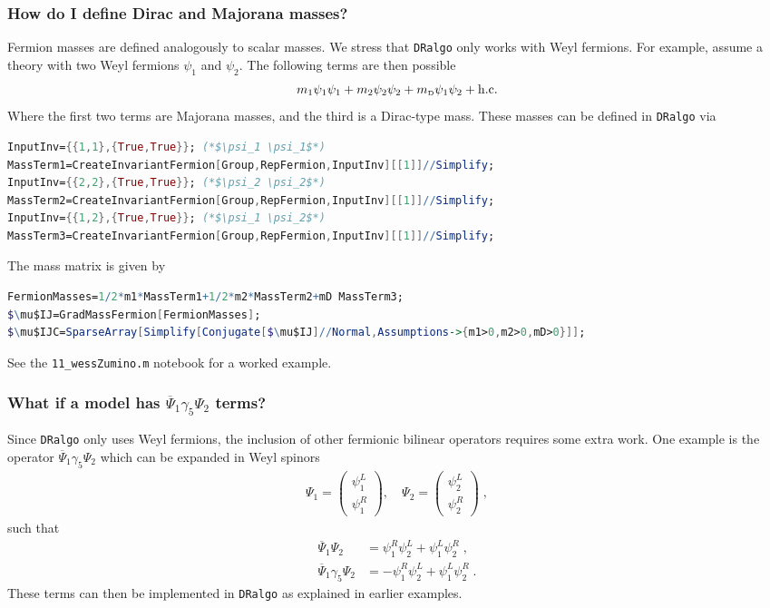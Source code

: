 \documentclass[11pt]{article}
\def\dralgo{{\tt DRalgo}}
\newcommand{\mD}{m_\rmii{D}}
\newcommand{\rmii}[1]{{\mbox{\tiny\rm{#1}}}}
\begin{document}
%
\subsubsection{How do I define Dirac and Majorana masses?}
Fermion masses are defined analogously to scalar masses.
We stress that \dralgo{} only works with Weyl fermions.
For example, assume a theory with
two Weyl fermions $\psi_1$ and $\psi_2$.
The following terms are then possible
\begin{align}
    m_1 \psi_1\psi_1
  + m_2 \psi_2\psi_2
  + \mD\psi_1\psi_2
  + \mathrm{h.c.}
\end{align}
Where the first two terms are Majorana masses, and the third is a Dirac-type mass. 
These masses can be defined in \dralgo{} via
\begin{lstlisting}[language=Mathematica,mathescape=true]
InputInv={{1,1},{True,True}}; (*$\psi_1 \psi_1$*)
MassTerm1=CreateInvariantFermion[Group,RepFermion,InputInv][[1]]//Simplify;
InputInv={{2,2},{True,True}}; (*$\psi_2 \psi_2$*)
MassTerm2=CreateInvariantFermion[Group,RepFermion,InputInv][[1]]//Simplify;
InputInv={{1,2},{True,True}}; (*$\psi_1 \psi_2$*)
MassTerm3=CreateInvariantFermion[Group,RepFermion,InputInv][[1]]//Simplify;
\end{lstlisting}
The mass matrix is given by
\begin{lstlisting}[language=Mathematica,mathescape=true]
FermionMasses=1/2*m1*MassTerm1+1/2*m2*MassTerm2+mD MassTerm3;
$\mu$IJ=GradMassFermion[FermionMasses];
$\mu$IJC=SparseArray[Simplify[Conjugate[$\mu$IJ]//Normal,Assumptions->{m1>0,m2>0,mD>0}]];
\end{lstlisting}
See the {\tt 11\_wessZumino.m} notebook for a worked example.

%
\subsubsection{What if a model has $\overline{\Psi}_1 \gamma_5\Psi_2$ terms?}

Since \dralgo{} only uses Weyl fermions,
the inclusion of other fermionic bilinear operators requires some extra work.
One example is the operator 
$\overline{\Psi}_1 \gamma_5\Psi_2$ which
can be expanded in Weyl spinors
\begin{align}
\Psi_1=\begin{pmatrix}
  \psi_1^L\\
  \psi_1^R
\end{pmatrix}, \quad
\Psi_2=\begin{pmatrix}
  \psi_2^L\\
  \psi_2^R
\end{pmatrix}
\;,
\end{align}
such that
\begin{align}
  \overline{\Psi}_1\Psi_2 &=
    \psi_1^R \psi_2^L
  + \psi_1^L \psi_2^R
  \;,\\
  \overline{\Psi}_1\gamma_5 \Psi_2 &=
  - \psi_1^R \psi_2^L
  + \psi_1^L \psi_2^R
  \;.
\end{align}
These terms can then be implemented in \dralgo{} as explained in earlier examples.
\end{document}
